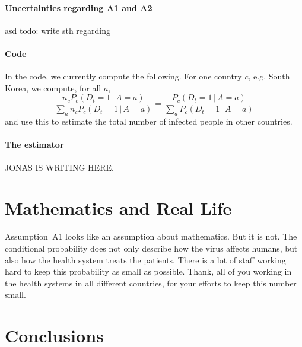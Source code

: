 \documentclass[a4paper]{article}
\newcommand\todo[1]{{\color{red}todo: #1}}
\begin{document}
\paragraph{Uncertainties regarding A1 and A2}
asd
\todo{write sth regarding}


\paragraph{Code}
In the code, we currently compute the following. 
For one country $c$, e.g. South Korea, we compute, for all $a$,
$$
\frac{n_c P_c(D_t = 1\,|\,A = a)}
{\sum_a n_c P_c(D_t = 1\,|\,A = a)}
=
\frac{P_c(D_t = 1\,|\,A = a)}
{\sum_a P_c(D_t = 1\,|\,A = a)}
$$
and use this to estimate the total number 
of infected people in other countries.



\paragraph{The estimator}
JONAS IS WRITING HERE.


\section{Mathematics and Real Life}
Assumption~A1 looks like an assumption about mathematics. 
But it is not. 
The conditional probability does not 
only describe how
the virus affects humans, 
but also how the health system treats the patients. 
There is a lot of staff working hard to 
keep this probability as small as possible. 
Thank, all of you working in the health systems in all different countries, for 
your efforts to keep this number small. 



\section{Conclusions}

\begin{center}
\end{center}
\end{document}
